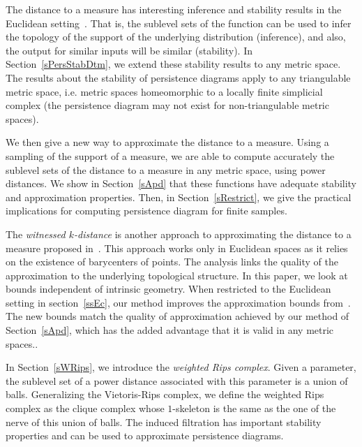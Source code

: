 \documentclass[a4paper]{article}
\begin{document}
The distance to a measure has interesting inference and stability results in the Euclidean setting~\cite{gipmCCM}.
That is, the sublevel sets of the function can be used to infer the topology of the support of the underlying distribution (inference), and also, the output for similar inputs will be similar (stability).
In Section~\ref{sPersStabDtm}, we extend these stability results to any metric space.
The results about the stability of persistence diagrams apply to any triangulable metric space, i.e. metric spaces homeomorphic to a locally finite simplicial complex (the persistence diagram may not exist for non-triangulable metric spaces).


We then give a new way to approximate the distance to a measure.
Using a sampling of the support of a measure, we are able to compute accurately the sublevel sets of the distance to a measure in any metric space, using power distances.
We show in Section~\ref{sApd} that these functions have adequate stability and approximation properties.
Then, in Section~\ref{sRestrict}, we give the practical implications for computing persistence diagram for finite samples.

The \emph{witnessed $k$-distance} is another approach to approximating the distance to a measure proposed in~\cite{wkdGMM}.
This approach works only in Euclidean spaces as it relies on the existence of barycenters of points.
The analysis links the quality of the approximation to the underlying topological structure.
In this paper, we look at bounds independent of intrinsic geometry.
When restricted to the Euclidean setting in section~\ref{ssEc}, our method improves the approximation bounds from~\cite{wkdGMM}.
The new bounds match the quality of approximation achieved by our method of Section~\ref{sApd}, which has the added advantage that it is valid in any metric spaces..


In Section~\ref{sWRips}, we introduce the \emph{weighted Rips complex}.
Given a parameter, the sublevel set of a power distance associated with this parameter is a union of balls.
Generalizing the Vietoris-Rips complex, we define the weighted Rips complex as the clique complex whose $1$-skeleton is the same as the one of the nerve of this union of balls.
The induced filtration has important stability properties and can be used to approximate  persistence diagrams.
\end{document}
